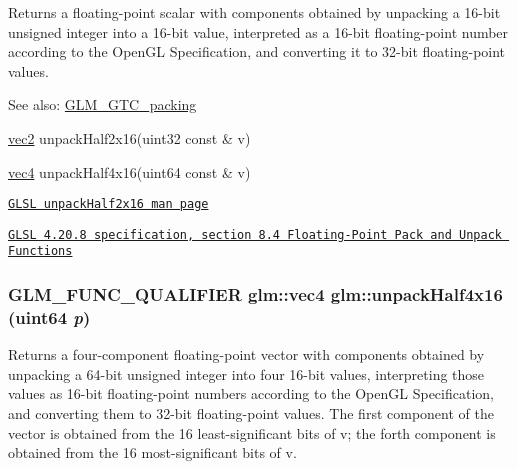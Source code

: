 Returns a floating-point scalar with components obtained by unpacking a 16-bit unsigned integer into a 16-bit value, interpreted as a 16-bit floating-point number according to the OpenGL Specification, and converting it to 32-bit floating-point values.

\begin{Desc}
\item[See also:]\hyperlink{group__gtc__packing}{GLM\_\-GTC\_\-packing} 

\hyperlink{group__core__types_ga1618f51db67eaa145db101d8c8431d8}{vec2} unpackHalf2x16(uint32 const \& v) 

\hyperlink{group__core__types_g5881b1b022d7fd1b7218f5916532dd02}{vec4} unpackHalf4x16(uint64 const \& v) 

\href{http://www.opengl.org/sdk/docs/manglsl/xhtml/unpackHalf2x16.xml}{\tt GLSL unpackHalf2x16 man page} 

\href{http://www.opengl.org/registry/doc/GLSLangSpec.4.20.8.pdf}{\tt GLSL 4.20.8 specification, section 8.4 Floating-Point Pack and Unpack Functions} \end{Desc}
\hypertarget{group__gtc__packing_gea526d6491ad40401eac34803984bf27}{
\subsubsection[unpackHalf4x16]{\setlength{\rightskip}{0pt plus 5cm}GLM\_\-FUNC\_\-QUALIFIER {\bf glm::vec4} glm::unpackHalf4x16 (uint64 {\em p})}}
\label{group__gtc__packing_gea526d6491ad40401eac34803984bf27}


Returns a four-component floating-point vector with components obtained by unpacking a 64-bit unsigned integer into four 16-bit values, interpreting those values as 16-bit floating-point numbers according to the OpenGL Specification, and converting them to 32-bit floating-point values. The first component of the vector is obtained from the 16 least-significant bits of v; the forth component is obtained from the 16 most-significant bits of v.


